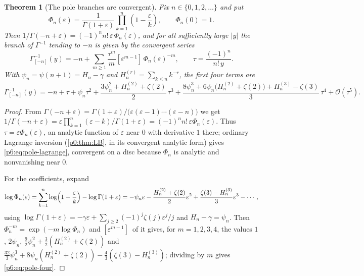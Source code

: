 \documentclass[11pt,a4paper,oneside]{book}
\theoremstyle{plain}
\newtheorem{theorem}{Theorem}[chapter]
\theoremstyle{definition}
\theoremstyle{remark}
\newcommand{\Coef}[1]{[#1]\,}
\newcommand{\bigO}{\mathcal{O}}
\begin{document}
\begin{theorem}[The pole branches are convergent]\label{p6:thm:pole-branches}
Fix $n\in\{0,1,2,\dots\}$ and put
\begin{equation}\label{p6:eq:Phi-n}
 \Phi_n(\varepsilon)
 =\frac1{\Gamma(1+\varepsilon)}\prod_{k=1}^{n}
   \left(1-\frac\varepsilon k\right),
 \qquad \Phi_n(0)=1 .
\end{equation}
Then $1/\Gamma(-n+\varepsilon)=(-1)^{n}n!\,\varepsilon\,\Phi_n(\varepsilon)$,
and for all sufficiently large $|y|$ the branch of $\Gamma^{-1}$ tending to
$-n$ is given by the \emph{convergent} series
\begin{equation}\label{p6:eq:pole-lagrange}
 \Gamma^{-1}_{[-n]}(y)=-n+\sum_{m\ge1}\frac{\tau^{m}}{m}
 \Coef{\varepsilon^{m-1}}\Phi_n(\varepsilon)^{-m},
 \qquad \tau=\frac{(-1)^{n}}{n!\,y}.
\end{equation}
With $\psi_n=\psi(n+1)=H_n-\gamma$ and $H_n^{(r)}=\sum_{k\le n}k^{-r}$, the
first four terms are
\begin{equation}\label{p6:eq:pole-four}
 \Gamma^{-1}_{[-n]}(y)=-n+\tau+\psi_n\tau^{2}
 +\frac{3\psi_n^{2}+H_n^{(2)}+\zeta(2)}2\,\tau^{3}
 +\frac{8\psi_n^{3}+6\psi_n\bigl(H_n^{(2)}+\zeta(2)\bigr)
 +H_n^{(3)}-\zeta(3)}3\,\tau^{4}
 +\bigO(\tau^{5}).
\end{equation}
\end{theorem}

\begin{proof}
From $\Gamma(-n+\varepsilon)
=\Gamma(1+\varepsilon)\bigl/\bigl(\varepsilon(\varepsilon-1)\cdots
(\varepsilon-n)\bigr)$ we get
$1/\Gamma(-n+\varepsilon)
=\varepsilon\prod_{k=1}^{n}(\varepsilon-k)/\Gamma(1+\varepsilon)
=(-1)^{n}n!\,\varepsilon\Phi_n(\varepsilon)$.  Thus
$\tau=\varepsilon\Phi_n(\varepsilon)$, an analytic function of $\varepsilon$
near $0$ with derivative $1$ there; ordinary Lagrange inversion
(\cref{p0:thm:LB}, in its convergent analytic form) gives
\eqref{p6:eq:pole-lagrange}, convergent on a disc because $\Phi_n$ is
analytic and nonvanishing near $0$.

For the coefficients, expand
\[
 \log\Phi_n(\varepsilon)
 =\sum_{k=1}^{n}\log\Bigl(1-\frac\varepsilon k\Bigr)-\log\Gamma(1+\varepsilon)
 =-\psi_n\varepsilon-\frac{H_n^{(2)}+\zeta(2)}2\varepsilon^{2}
 +\frac{\zeta(3)-H_n^{(3)}}3\varepsilon^{3}-\cdots,
\]
using $\log\Gamma(1+\varepsilon)=-\gamma\varepsilon+\sum_{j\ge2}
(-1)^{j}\zeta(j)\varepsilon^{j}/j$ and $H_n-\gamma=\psi_n$.  Then
$\Phi_n^{-m}=\exp(-m\log\Phi_n)$ and
$\Coef{\varepsilon^{m-1}}$ of it gives, for $m=1,2,3,4$, the values
$1$, $2\psi_n$, $\tfrac92\psi_n^{2}+\tfrac32(H_n^{(2)}+\zeta(2))$ and
$\tfrac{32}3\psi_n^{3}+8\psi_n(H_n^{(2)}+\zeta(2))
-\tfrac43(\zeta(3)-H_n^{(3)})$; dividing by $m$ gives
\eqref{p6:eq:pole-four}.
\end{proof}
\end{document}
